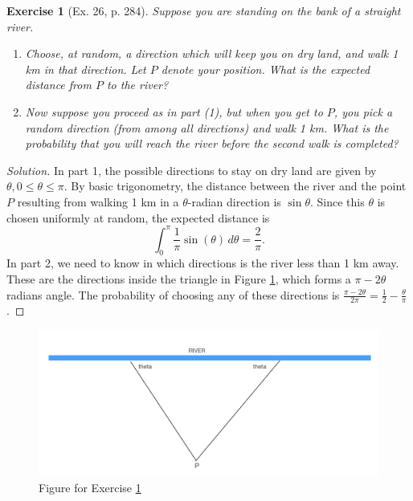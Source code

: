 \documentclass[letterpaper, 10 pt, conference]{article}
\newtheorem{ex}{Exercise}
\begin{document}
\begin{ex}[Ex. 26, p. 284] \label{ex:river}
Suppose you are standing on the bank of a straight river.
\begin{enumerate}
	\item Choose, at random, a direction which will keep you on dry land, and walk 1 km in that direction. Let $P$ denote your position. What is the expected distance from $P$ to the river?
	\item Now suppose you proceed as in part (1), but when you get to $P$, you pick a random direction (from among \textit{all} directions) and walk 1 km. What is the probability that you will reach the river before the second walk is completed?
\end{enumerate}
\end{ex}
\begin{proof}[Solution]
	In part 1, the possible directions to stay on dry land are given by $\theta, 0 \leq \theta \leq \pi$. By basic trigonometry, the distance between the river and the point $P$ resulting from walking 1 km in a $\theta$-radian direction is $\sin \theta$. Since this $\theta$ is chosen uniformly at random, the expected distance is 
	\begin{equation}
		\int_{0}^{\pi} \frac{1}{\pi} \sin( \theta) \, d\theta = \frac{2}{\pi}.
	\end{equation}
	In part 2, we need to know in which directions is the river less than 1 km away. These are the directions inside the triangle in Figure \ref{fig:river}, which forms a $\pi - 2\theta$ radians angle. The probability of choosing any of these directions is $\frac{\pi-2\theta}{2\pi} = \frac{1}{2} - \frac{\theta}{\pi}$.
\end{proof}

\begin{figure}
	\centering
	\includegraphics[width=0.6\linewidth]{river_problem}
	\caption{Figure for Exercise \ref{ex:river}}
	\label{fig:river}
\end{figure}
\end{document}
